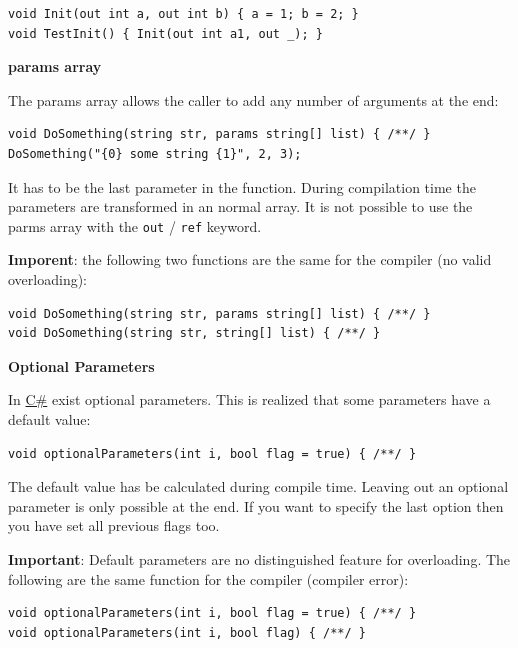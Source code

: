 \documentclass[11pt,twoside,landscape]{article}
\begin{document}
\begin{multicols}{3}
\lstset{language=csharp,label= ,caption= ,captionpos=b,numbers=none}
\begin{lstlisting}
void Init(out int a, out int b) { a = 1; b = 2; }
void TestInit() { Init(out int a1, out _); }
\end{lstlisting}

\textbf{params array}

The params array allows the caller to add any number of arguments at the end:
\lstset{language=csharp,label= ,caption= ,captionpos=b,numbers=none}
\begin{lstlisting}
void DoSomething(string str, params string[] list) { /**/ }
DoSomething("{0} some string {1}", 2, 3); 
\end{lstlisting}

It has to be the last parameter in the function. During compilation time the parameters are transformed in an normal array. It is not possible to use the parms array with the \texttt{out} / \texttt{ref} keyword.

\textbf{Imporent}: the following two functions are the same for the compiler (no valid overloading):
\lstset{language=csharp,label= ,caption= ,captionpos=b,numbers=none}
\begin{lstlisting}
void DoSomething(string str, params string[] list) { /**/ }
void DoSomething(string str, string[] list) { /**/ }
\end{lstlisting}

\textbf{Optional Parameters}

In \href{../../../roam/20211003114158-c.org}{C\#} exist optional parameters.
This is realized that some parameters have a default value:
\lstset{language=csharp,label= ,caption= ,captionpos=b,numbers=none}
\begin{lstlisting}
void optionalParameters(int i, bool flag = true) { /**/ }
\end{lstlisting}

The default value has be calculated during compile time.
Leaving out an optional parameter is only possible at the end.
If you want to specify the last option then you have set all previous flags too.

\textbf{Important}: Default parameters are no distinguished feature for overloading.
The following are the same function for the compiler (compiler error):
\lstset{language=csharp,label= ,caption= ,captionpos=b,numbers=none}
\begin{lstlisting}
void optionalParameters(int i, bool flag = true) { /**/ }
void optionalParameters(int i, bool flag) { /**/ }
\end{lstlisting}


\end{multicols}
\end{document}
